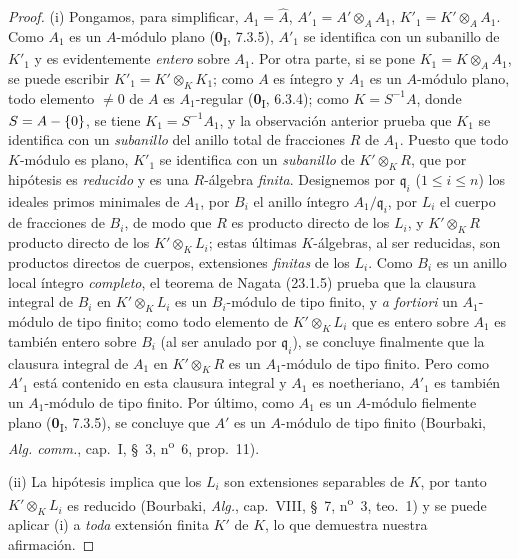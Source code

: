 \begin{proof}
(i) Pongamos, para simplificar, $A_1=\widehat A$,
$A'_1=A'\otimes_AA_1$, $K'_1=K'\otimes_AA_1$. Como $A_1$ es un
$A$-módulo plano (\textbf{0}\textsubscript{I}, 7.3.5), $A'_1$ se identifica con un
subanillo de $K'_1$ y es evidentemente \emph{entero} sobre $A_1$. Por otra parte, si
se pone $K_1=K\otimes_AA_1$, se puede escribir
$K'_1=K'\otimes_KK_1$; como $A$ es íntegro y $A_1$ es un $A$-módulo
plano, todo elemento $\neq0$ de $A$ es $A_1$-regular
(\textbf{0}\textsubscript{I}, 6.3.4); como $K=S^{-1}A$, donde $S=A-\{0\}$, se tiene
$K_1=S^{-1}A_1$, y la observación anterior prueba que $K_1$ se identifica con un
\emph{subanillo} del anillo total de fracciones $R$ de $A_1$. Puesto que todo
$K$-módulo es plano, $K'_1$ se identifica con un \emph{subanillo} de $K'\otimes_KR$,
que por hipótesis es \emph{reducido} y es una $R$-álgebra \emph{finita}. Designemos por
$\mathfrak q_i$ ($1\leqslant i\leqslant n$) los ideales primos minimales de
$A_1$, por $B_i$ el anillo íntegro $A_1/\mathfrak q_i$, por $L_i$ el cuerpo de
fracciones de $B_i$, de modo que $R$ es producto directo de los $L_i$, y
$K'\otimes_KR$ producto directo de los $K'\otimes_KL_i$; estas últimas
$K$-álgebras, al ser reducidas, son productos directos de cuerpos,
extensiones \emph{finitas} de los $L_i$. Como $B_i$ es un anillo local íntegro
\emph{completo}, el teorema de Nagata (23.1.5) prueba que la clausura
integral de $B_i$ en $K'\otimes_KL_i$ es un $B_i$-módulo de tipo finito, y
\emph{a fortiori} un $A_1$-módulo de tipo finito; como todo elemento de
$K'\otimes_KL_i$ que es entero sobre $A_1$ es también entero sobre $B_i$ (al ser
anulado por $\mathfrak q_i$), se concluye finalmente que la clausura
integral de $A_1$ en $K'\otimes_KR$ es un $A_1$-módulo de tipo finito. Pero
como $A'_1$ está contenido en esta clausura integral y $A_1$ es
noetheriano, $A'_1$ es también un $A_1$-módulo de tipo finito. Por último, como $A_1$
es un $A$-módulo fielmente plano (\textbf{0}\textsubscript{I}, 7.3.5), se concluye
que $A'$ es un $A$-módulo de tipo finito (Bourbaki, \emph{Alg. comm.},
cap.~I, §~3, n\textsuperscript{o}~6, prop.~11).


(ii) La hipótesis implica que los $L_i$ son extensiones separables
de $K$, por tanto $K'\otimes_KL_i$ es reducido (Bourbaki, \emph{Alg.}, cap.~VIII,
§~7, n\textsuperscript{o}~3, teo.~1) y se puede aplicar (i) a \emph{toda}
extensión finita $K'$ de $K$, lo que demuestra nuestra afirmación.
\end{proof}


